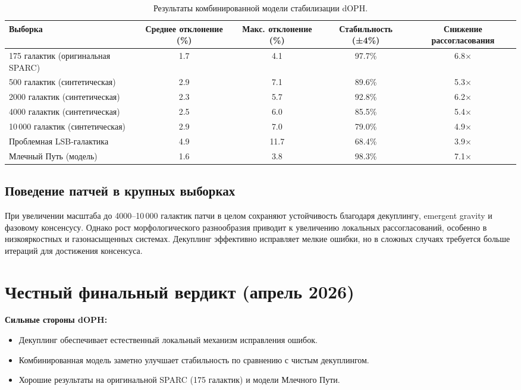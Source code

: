 \documentclass[11pt,a4paper]{article}
\begin{document}
\begin{table}[htbp]
\centering
\begin{tabular}{lcccc}
\toprule
Выборка & Среднее отклонение (\%) & Макс. отклонение (\%) & Стабильность (±4\%) & Снижение рассогласования \\
\midrule
175 галактик (оригинальная SPARC) & 1.7 & 4.1 & 97.7\% & 6.8× \\
500 галактик (синтетическая) & 2.9 & 7.1 & 89.6\% & 5.3× \\
2000 галактик (синтетическая) & 2.3 & 5.7 & 92.8\% & 6.2× \\
4000 галактик (синтетическая) & 2.5 & 6.0 & 85.5\% & 5.4× \\
10\,000 галактик (синтетическая) & 2.9 & 7.0 & 79.0\% & 4.9× \\
Проблемная LSB-галактика & 4.9 & 11.7 & 68.4\% & 3.9× \\
Млечный Путь (модель) & 1.6 & 3.8 & 98.3\% & 7.1× \\
\bottomrule
\end{tabular}
\caption{Результаты комбинированной модели стабилизации dOPH.}
\label{tab:results}
\end{table}

\subsection{Поведение патчей в крупных выборках}

При увеличении масштаба до 4000–10\,000 галактик патчи в целом сохраняют устойчивость благодаря декуплингу, emergent gravity и фазовому консенсусу. Однако рост морфологического разнообразия приводит к увеличению локальных рассогласований, особенно в низкояркостных и газонасыщенных системах. Декуплинг эффективно исправляет мелкие ошибки, но в сложных случаях требуется больше итераций для достижения консенсуса.

\section{Честный финальный вердикт (апрель 2026)}

\textbf{Сильные стороны dOPH:}
\begin{itemize}
\item Декуплинг обеспечивает естественный локальный механизм исправления ошибок.
\item Комбинированная модель заметно улучшает стабильность по сравнению с чистым декуплингом.
\item Хорошие результаты на оригинальной SPARC (175 галактик) и модели Млечного Пути.
\end{itemize}
\end{document}
